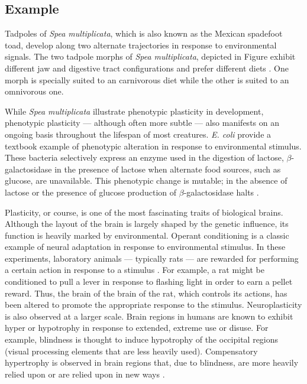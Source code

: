 \subsection{Example}
 
Tadpoles of \textit{Spea multiplicata}, which is also known as the Mexican spadefoot toad, develop along two alternate trajectories in response to environmental signals. The two tadpole morphs of \textit{Spea multiplicata}, depicted in Figure  exhibit different jaw and digestive tract configurations and prefer different diets \cite{Fusco2010PhenotypicConcepts}. One morph is specially suited to an carnivorous diet while the other is suited to an omnivorous one\cite{Pfennig1992PolyphenismStrategy}.

While \textit{Spea multiplicata} illustrate phenotypic plasticity in development, phenotypic plasticity --- although often more subtle --- also manifests on an ongoing basis throughout the lifespan of most creatures. \textit{E. coli} provide a textbook example of phenotypic alteration in response to environmental stimulus. These bacteria selectively express an enzyme used in the digestion of lactose, $\beta$-galactosidase in the presence of lactose when alternate food sources, such as glucose, are unavailable. This phenotypic change is mutable; in the absence of lactose or the presence of glucose production of $\beta$-galactosidase halts \cite[page XXX]{Griffiths2015IntroductionAnalysis}.

Plasticity, or course, is one of the most fascinating traits of biological brains. Although the layout of the brain is largely shaped by the genetic influence, its function is heavily marked by environmental. Operant conditioning is a classic example of neural adaptation in response to environmental stimulus. In these experiments, laboratory animals --- typically rats --- are rewarded for performing a certain action in response to a stimulus  \cite{Skinner1991TheAnalysis}. For example, a rat might be conditioned to pull a lever in response to flashing light in order to earn a pellet reward. Thus, the brain of the brain of the rat, which controls its actions, has been altered to promote the appropriate response to the stimulus. Neuroplasticity is also observed at a larger scale. Brain regions in humans are known to exhibit hyper or hypotrophy in response to extended, extreme use or disuse. For example, blindness is thought to induce hypotrophy of the occipital regions (visual processing elements that are less heavily used). Compensatory hypertrophy is observed in brain regions that, due to blindness, are more heavily relied upon or are relied upon in new ways \cite{Lepore2010BrainSubjects}. 

